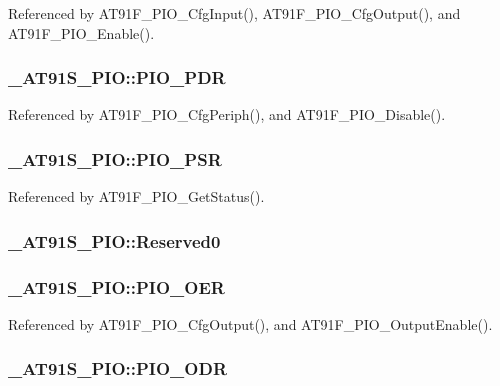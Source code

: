 Referenced by AT91F\_\-PIO\_\-CfgInput(), AT91F\_\-PIO\_\-CfgOutput(), and AT91F\_\-PIO\_\-Enable().\hypertarget{struct__AT91S__PIO_1562c48486ffd8abe50d80ae6c37ec8f}{
\subsubsection{ {\bf \_\-AT91S\_\-PIO::PIO\_\-PDR}}}
\label{struct__AT91S__PIO_1562c48486ffd8abe50d80ae6c37ec8f}




Referenced by AT91F\_\-PIO\_\-CfgPeriph(), and AT91F\_\-PIO\_\-Disable().\hypertarget{struct__AT91S__PIO_05c0cb31a5592c29fc2e499463be3184}{
\subsubsection{ {\bf \_\-AT91S\_\-PIO::PIO\_\-PSR}}}
\label{struct__AT91S__PIO_05c0cb31a5592c29fc2e499463be3184}




Referenced by AT91F\_\-PIO\_\-GetStatus().\hypertarget{struct__AT91S__PIO_04904720c11b78e63134fadf6a71f4fc}{
\subsubsection{ {\bf \_\-AT91S\_\-PIO::Reserved0}}}
\label{struct__AT91S__PIO_04904720c11b78e63134fadf6a71f4fc}


\hypertarget{struct__AT91S__PIO_d98a2d712fd626ab4e7f4a03a67b92a3}{
\subsubsection{ {\bf \_\-AT91S\_\-PIO::PIO\_\-OER}}}
\label{struct__AT91S__PIO_d98a2d712fd626ab4e7f4a03a67b92a3}




Referenced by AT91F\_\-PIO\_\-CfgOutput(), and AT91F\_\-PIO\_\-OutputEnable().\hypertarget{struct__AT91S__PIO_7994c9c78ecec3f0793d60c6e7701d5d}{
\subsubsection{ {\bf \_\-AT91S\_\-PIO::PIO\_\-ODR}}}
\label{struct__AT91S__PIO_7994c9c78ecec3f0793d60c6e7701d5d}




